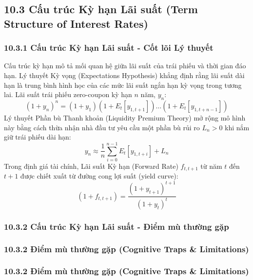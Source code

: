 \documentclass[
]{article}
\begin{document}
\subsection{10.3 Cấu trúc Kỳ hạn Lãi suất (Term Structure of Interest
Rates)}\label{cux1ea5u-truxfac-kux1ef3-hux1ea1n-luxe3i-suux1ea5t-term-structure-of-interest-rates}

\subsubsection{10.3.1 Cấu trúc Kỳ hạn Lãi suất - Cốt lõi Lý
thuyết}\label{cux1ea5u-truxfac-kux1ef3-hux1ea1n-luxe3i-suux1ea5t---cux1ed1t-luxf5i-luxfd-thuyux1ebft}

Cấu trúc kỳ hạn mô tả mối quan hệ giữa lãi suất của trái phiếu và thời
gian đáo hạn. Lý thuyết Kỳ vọng (Expectations Hypothesis) khẳng định
rằng lãi suất dài hạn là trung bình hình học của các mức lãi suất ngắn
hạn kỳ vọng trong tương lai. Lãi suất trái phiếu zero-coupon kỳ hạn
\(n\) năm, \(y_n\):
\[ (1 + y_n)^n = (1 + y_1)(1 + E_t[y_{1, t+1}]) \dots (1 + E_t[y_{1, t+n-1}]) \]
Lý thuyết Phần bù Thanh khoản (Liquidity Premium Theory) mở rộng mô hình
này bằng cách thừa nhận nhà đầu tư yêu cầu một phần bù rủi ro
\(L_n > 0\) khi nắm giữ trái phiếu dài hạn:
\[ y_n \approx \frac{1}{n} \sum_{i=0}^{n-1} E_t[y_{1, t+i}] + L_n \]
Trong định giá tài chính, Lãi suất Kỳ hạn (Forward Rate) \(f_{t, t+1}\)
từ năm \(t\) đến \(t+1\) được chiết xuất từ đường cong lợi suất (yield
curve): \[ (1 + f_{t, t+1}) = \frac{(1 + y_{t+1})^{t+1}}{(1 + y_t)^t} \]

\subsubsection{10.3.2 Cấu trúc Kỳ hạn Lãi suất - Điểm mù thường
gặp}\label{cux1ea5u-truxfac-kux1ef3-hux1ea1n-luxe3i-suux1ea5t---ux111iux1ec3m-muxf9-thux1b0ux1eddng-gux1eb7p}

\subsubsection{10.3.2 Điểm mù thường gặp (Cognitive Traps \&
Limitations)}\label{ux111iux1ec3m-muxf9-thux1b0ux1eddng-gux1eb7p-cognitive-traps-limitations-80}

\subsubsection{10.3.2 Điểm mù thường gặp (Cognitive Traps \&
Limitations)}\label{ux111iux1ec3m-muxf9-thux1b0ux1eddng-gux1eb7p-cognitive-traps-limitations-81}
\end{document}
